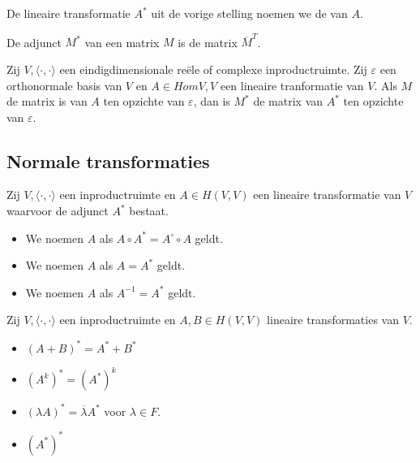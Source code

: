 \documentclass[main.tex]{subfiles}
\begin{document}
\begin{de}
  De lineaire transformatie $A^{*}$ uit de vorige stelling noemen we de  van $A$.
\end{de}

\begin{de}
  De adjunct $M^{*}$ van een matrix $M$ is de matrix $\overline{M}^{T}$.
\end{de}

\begin{ei}
  Zij $V,\langle\cdot,\cdot\rangle$ een eindigdimensionale re\"ele of complexe inproductruimte. 
  Zij $\varepsilon$ een orthonormale basis van $V$ en $A \in Hom{V,V}$ een lineaire tranformatie van $V$.
  Als $M$ de matrix is van $A$ ten opzichte van $\varepsilon$, dan is $M^{*}$ de matrix van $A^{*}$ ten opzichte van $\varepsilon$.
\end{ei}

\subsection{Normale transformaties}
\label{sec:norm-transf-1}

\begin{de}
  Zij $V,\langle\cdot,\cdot\rangle$ een inproductruimte en $A\in H(V,V)$ een lineaire transformatie van $V$ waarvoor de adjunct $A^{*}$ bestaat.
  \begin{itemize}
  \item We noemen $A$  als $A\circ A^{*} = A^{\circ} \circ A$ geldt.
  \item We noemen $A$  als $A=A^{*}$ geldt.
  \item We noemen $A$  als $A^{-1} = A^{*}$ geldt.
  \end{itemize}
\end{de}

\begin{lem}
  \examen
  Zij $V,\langle\cdot,\cdot\rangle$ een inproductruimte en $A,B \in H(V,V)$ lineaire transformaties van $V$.
  \begin{itemize}
  \item $(A+B)^{*} = A^{*} + B^{*}$
  \item $(A^{k})^{*} = (A^{*})^{k}$
  \item $(\lambda A)^{*} = \overline{\lambda}A^{*}$ voor $\lambda \in F$.
  \item $(A^{*})^{*}$
  \end{itemize}
\end{lem}
\end{document}
